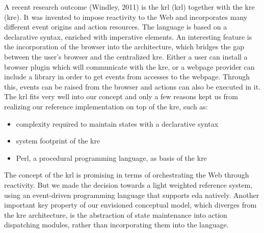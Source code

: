 A recent research outcome (Windley, 2011) is the \textrm{\acrlong{krl} (\acrshort{krl})}\cite{bookTheLiveWeb} together with the \textrm{\acrlong{kre} (\acrshort{kre})}.
It was invented to impose reactivity to the Web and incorporates many different event origins and action resources.
The language is based on a declarative syntax, enriched with imperative elements.
An interesting feature is the incorporation of the browser into the architecture, which bridges the gap between the user's browser and the centralized \textrm{\acrshort{kre}}.
Either a user can install a browser plugin which will communicate with the \textrm{\acrshort{kre}}, or a webpage provider can include a library in order to get events from accesses to the webpage.
Through this, events can be raised from the browser and actions can also be executed in it.
The \textrm{\acrshort{krl}} fits very well into our concept and only a few reasons kept us from realizing our reference implementation on top of the \textrm{\acrshort{kre}}, such as:
\begin{itemize}
  \item complexity required to maintain states with a declarative syntax 
  \item system footprint of the \textrm{\acrshort{kre}}
  \item \textrm{Perl}, a procedural programming language, as basis of the \textrm{\acrshort{kre}}
\end{itemize}
The concept of the \textrm{\acrshort{krl}} is promising in terms of orchestrating the Web through reactivity.
But we made the decision towards a light weighted reference system, using an event-driven programming language that supports \textrm{\acrlong{eda}} natively.
Another important key property of our envisioned conceptual model, which diverges from the \textrm{\acrshort{kre}} architecture, is the abstraction of state maintenance into action dispatching modules, rather than incorporating them into the language.

